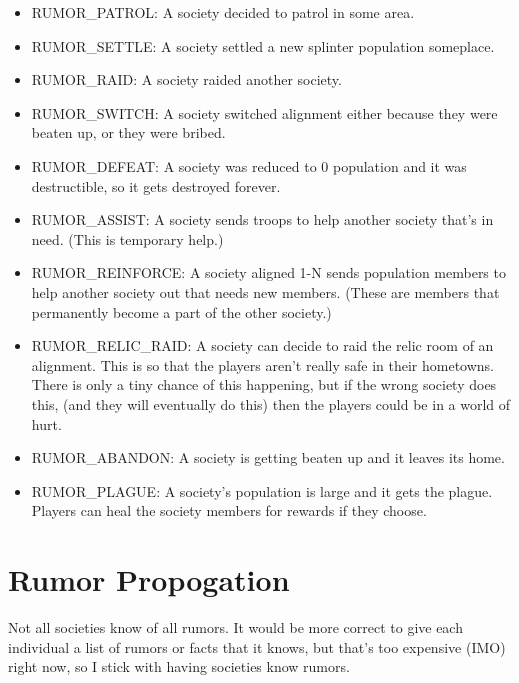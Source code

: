 \begin{itemize}

\item RUMOR\_PATROL: A society decided to patrol in some area.

\item RUMOR\_SETTLE: A society settled a new splinter population someplace.

\item RUMOR\_RAID: A society raided another society.

\item RUMOR\_SWITCH: A society switched alignment either because they were
  beaten up, or they were bribed.


\item RUMOR\_DEFEAT: A society was reduced to 0 population and it was
  destructible, so it gets destroyed forever.

\item RUMOR\_ASSIST: A society sends troops to help another society that's
in need. (This is temporary help.)
\item RUMOR\_REINFORCE: A society aligned 1-N sends population members
to help another society out that needs new members. (These are members that
permanently become a part of the other society.)


\item RUMOR\_RELIC\_RAID: A society can decide to raid the relic room
of an alignment. This is so that the players aren't really safe in their
hometowns. There is only a tiny chance of this happening, but if the
wrong society does this, (and they will eventually do this) then the
players could be in a world of hurt.

\item RUMOR\_ABANDON: A society is getting beaten up and it leaves its
home.

\item RUMOR\_PLAGUE: A society's population is large and it gets the
  plague. Players can heal the society members for rewards if they choose.


\end{itemize}

\section{Rumor Propogation}

Not all societies know of all rumors. It would be more correct to
give each individual a list of rumors or facts that it knows,
but that's too expensive (IMO) right now, so I stick with having
societies know rumors.

